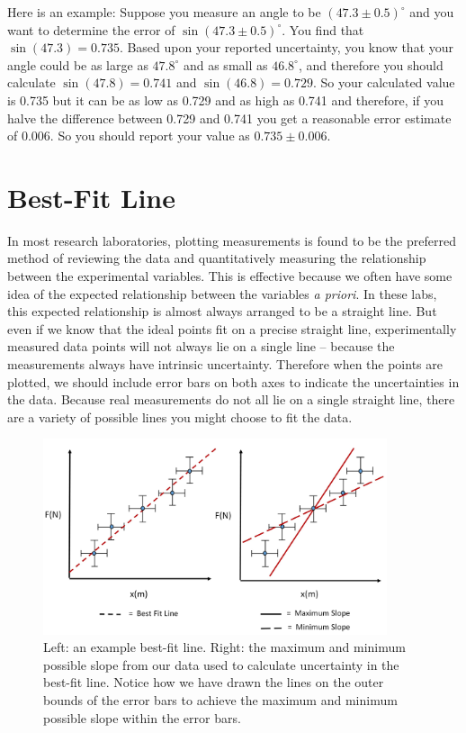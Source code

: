 \documentclass[letterpaper, 12pt]{book}
\newcommand{\myskip}{\vspace{0.5\baselineskip}}
\begin{document}
Here is an example: Suppose you measure an angle to be $(47.3 \pm 0.5)^\circ$ and you want to determine the error of $\sin(47.3 \pm 0.5)^\circ$. You find that $\sin(47.3) = 0.735$. Based upon your reported uncertainty, you know that your angle could be as large as $47.8^\circ$ and as small as $46.8^\circ$, and therefore you should calculate $\sin(47.8) = 0.741$ and $\sin(46.8) = 0.729$. So your calculated value is 0.735 but it can be as low as 0.729 and as high as 0.741 and therefore, if you halve the difference between 0.729 and 0.741 you get a reasonable error estimate of 0.006. So you should report your value as $0.735 \pm 0.006$.

\section{Best-Fit Line}

In most research laboratories, plotting measurements is found to be the preferred method of reviewing the data and quantitatively measuring the relationship between the experimental variables. This is effective because we often have some idea of the expected relationship between the variables {\it{a priori}}. In these labs, this expected relationship is almost always arranged to be a straight line. But even if we know that the ideal points fit on a precise straight line, experimentally measured data points will not always lie on a single line -- because the measurements always have intrinsic uncertainty. Therefore when the points are plotted, we should include error bars on both axes to indicate the uncertainties in the data. Because real measurements do not all lie on a single straight line, there are a variety of possible lines you might choose to fit the data. \myskip

\begin{figure}[h]
    \begin{center}
        \includegraphics[width=0.9\textwidth, height=0.5\textwidth]{./pic/image13.jpg}
    \end{center}
    \caption{Left: an example best-fit line. Right: the maximum and minimum possible slope from our data used to calculate uncertainty in the best-fit line. Notice how we have drawn the lines on the outer bounds of the error bars to achieve the maximum and minimum possible slope within the error bars.}
    \label{fig:bestfit}
\end{figure}
\end{document}

